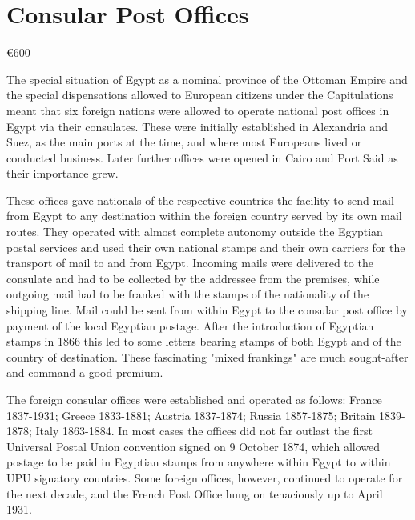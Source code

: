 \documentclass[justified]{tufte-book}
\begin{document}
\chapter{Consular Post Offices}\euro600

\normalsize

The special situation of Egypt as a nominal province of the Ottoman Empire and the special dispensations allowed to European citizens under the Capitulations meant that six foreign nations were allowed to operate national post offices in Egypt via their consulates. These were initially established in Alexandria and Suez, as the main ports at the time, and where most Europeans lived or conducted business. Later further offices were opened in Cairo and Port Said as their importance grew. 

These offices gave nationals of the respective countries the facility to send mail from Egypt to any destination within the foreign country served by its own mail routes. They operated with almost complete autonomy outside the Egyptian postal services and used their own national stamps and their own carriers for the transport of mail to and from Egypt. Incoming mails were delivered to the consulate and had to be collected by the addressee from the premises, while outgoing mail had to be franked with the stamps of the nationality of the shipping line. Mail could be sent from within Egypt to the consular post office by payment of the local Egyptian postage. After the introduction of Egyptian stamps in 1866 this led to some letters bearing stamps of both Egypt and of the country of destination. These fascinating "mixed frankings" are much sought-after and command a good premium. 

The foreign consular offices were established and operated as follows: France 1837-1931; Greece 1833-1881; Austria 1837-1874; Russia 1857-1875; Britain 1839-1878; Italy 1863-1884. In most cases the offices did not far outlast the first Universal Postal Union convention signed on 9 October 1874, which allowed postage to be paid in Egyptian stamps from anywhere within Egypt to within UPU signatory countries. Some foreign offices, however, continued to operate for the next decade, and the French Post Office hung on tenaciously up to April 1931. 

%
\end{document}
